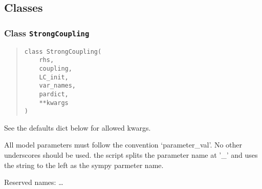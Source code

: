 \documentclass[
  english,
  a4paper,
  oneside]{article}
\begin{document}
\hypertarget{classes}{%
\subsection{Classes}\label{classes}}

\hypertarget{StrongCoupling.StrongCoupling}{%
\subsubsection{\texorpdfstring{Class
\texttt{StrongCoupling}}{Class StrongCoupling}}\label{StrongCoupling.StrongCoupling}}

\begin{quote}
\begin{verbatim}
class StrongCoupling(
    rhs,
    coupling,
    LC_init,
    var_names,
    pardict,
    **kwargs
)
\end{verbatim}
\end{quote}

See the defaults dict below for allowed kwargs.

All model parameters must follow the convention `parameter\_val'. No
other underscores should be used. the script splits the parameter name
at '\_' and uses the string to the left as the sympy parmeter name.

Reserved names: \ldots{}
\end{document}
